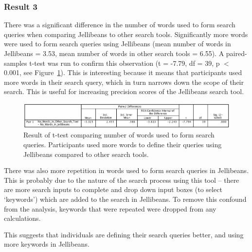 \documentclass[a4paper, 11pt]{article}
\begin{document}
\subsubsection{Result 3}
There was a significant difference in the number of words used to form search queries when comparing Jellibeans to other search tools. Significantly more words were used to form search queries using Jellibeans (mean number of words in Jellibeans = 3.53, mean number of words in other search tools = 6.55). A paired-samples t-test was run to confirm this observation (t = -7.79, df = 39, p $<$ 0.001, see Figure~\ref{result3}). This is interesting because it means that participants used more words in their search query, which in turn narrows down the scope of their search. This is useful for increasing precision scores of the Jellibeans search tool.

\begin{figure}[H]
\begin{center}
\includegraphics[scale=0.47]{Result3}
\caption{Result of t-test comparing number of words used to form search queries. Participants used more words to define their queries using Jellibeans compared to other search tools.}
\label{result3}
\end{center}
\end{figure}

There was also more repetition in words used to form search queries in Jellibeans. This is probably due to the nature of the search process using this tool -- there are more search inputs to complete and drop down input boxes (to select `keywords') which are added to the search in Jellibeans. To remove this confound from the analysis, keywords that were repeated were dropped from any calculations.

\vspace{5mm}
This suggests that individuals are defining their search queries better, and using more keywords in Jellibeans.  
\end{document}
